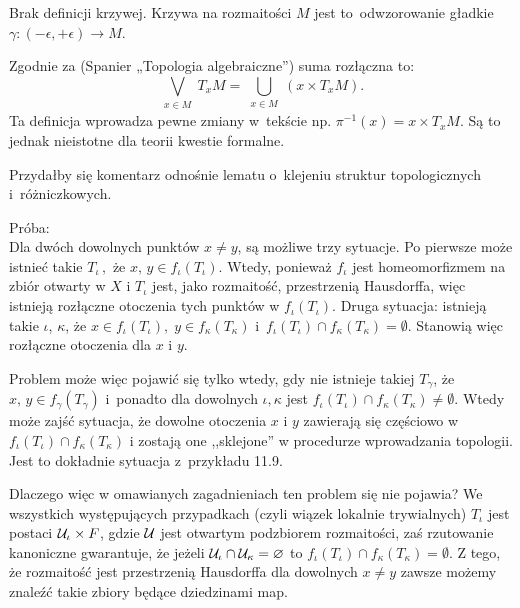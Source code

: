 \documentclass[a4paper,11pt]{article}
\begin{document}
\noindent
{} Brak definicji krzywej. Krzywa na rozmaitości $M$ jest
to~odwzorowanie gładkie $\gamma : ( -\epsilon, +\epsilon ) \to M$.

\vspace{\spaceFour}





\noindent
{} Zgodnie za \cite{} (Spanier „Topologia algebraiczne”) suma
rozłączna to:
\begin{equation}
  \label{eq:Gancarzewicz-ZarysETC-s01-01}
  \bigvee_{ \substack{ x \in M } } T_{ x } M
  = \bigcup_{ \substack{ x \in M } }( x \times T_{ x } M ).
\end{equation}
Ta definicja wprowadza pewne zmiany w~tekście np.
$\pi^{ -1 }( x ) = x \times T_{ x }M$. Są to jednak nieistotne dla
teorii kwestie formalne.

\vspace{\spaceFour}





\noindent
{} Przydałby się komentarz odnośnie lematu o~klejeniu struktur
topologicznych i~różniczkowych.

Próba: \\
Dla dwóch dowolnych punktów $x \neq y$, są możliwe trzy sytuacje. Po
pierwsze może istnieć takie $T_{ \iota } \, ,$ że
$x, \, y \in f_{ \iota }( T_{ \iota } )$. Wtedy, ponieważ
$f_{ \iota }$ jest homeomorfizmem na zbiór otwarty w $X$ i $T_{ \iota }$
jest, jako rozmaitość, przestrzenią Hausdorffa, więc istnieją
rozłączne otoczenia tych punktów w $f_{ \iota } ( T_{ \iota } )$.
Druga sytuacja: istnieją takie $\iota$, $\kappa$, że
$x \in f_{ \iota } ( T_{ \iota } ), \; y \in f_{ \kappa } ( T_{ \kappa } )$
i~$f_{ \iota } ( T_{ \iota } ) \cap f_{ \kappa } ( T_{ \kappa } ) = \emptyset$.
Stanowią więc rozłączne otoczenia dla $x$ i $y$.

Problem może więc pojawić się tylko wtedy, gdy nie istnieje takiej
$T_{ \gamma }$, że $x, \, y \in f_{ \gamma }( T_{ \gamma } )$
i~ponadto dla dowolnych $\iota, \kappa$ jest
$f_{ \iota } ( T_{ \iota } ) \cap f_{ \kappa } ( T_{ \kappa } ) \neq \emptyset$. Wtedy może zajść sytuacja,
że dowolne otoczenia $x$ i $y$
zawierają się częściowo w
$f_{ \iota } ( T_{ \iota } ) \cap f_{ \kappa } ( T_{ \kappa } )$ i
zostają one ,,sklejone'' w procedurze wprowadzania topologii. Jest to
dokładnie sytuacja z~przykładu 11.9.

Dlaczego więc w omawianych zagadnieniach ten problem się nie
pojawia? We wszystkich występujących przypadkach (czyli wiązek
lokalnie trywialnych) $T_{ \iota }$ jest postaci
$\mathcal{U}_{ \iota } \times F$, gdzie $\mathcal{U}$ jest otwartym
podzbiorem rozmaitości, zaś rzutowanie kanoniczne gwarantuje, że
jeżeli $\mathcal{U}_{ \iota } \cap \mathcal{U}_{ \kappa } = \varnothing$ to
$f_{ \iota } (T_{ \iota }) \cap f_{ \kappa }(T_{ \kappa }) = \emptyset$. Z tego, że rozmaitość jest
przestrzenią Hausdorffa dla
dowolnych $x \neq y$ zawsze możemy znaleźć takie zbiory będące
dziedzinami map.
\end{document}

